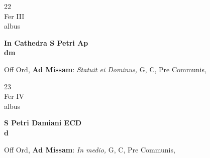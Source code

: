 \documentclass[10pt, openany]{book}
\begin{document}
        \begin{center}
            \begin{minipage}{3.5in}
                \vspace{2em}
                \begin{minipage}{0.5in}
                    {\Huge 22} \\
                    {\normalsize Fer III} \\
                    {\normalsize albus}
                \end{minipage}
                \begin{minipage}{3.0in}
                    \textbf{ \large In Cathedra S Petri Ap \\
                    \textnormal{\normalsize dm}} \\ 
                \end{minipage}
                \begin{justify}Off Ord, \textbf{Ad Missam}: \textit{Statuit ei Dominus,} G, C, Pre Communis,  
                \end{justify}
            \end{minipage}
        \end{center}
    
        \begin{center}
            \begin{minipage}{3.5in}
                \vspace{2em}
                \begin{minipage}{0.5in}
                    {\Huge 23} \\
                    {\normalsize Fer IV} \\
                    {\normalsize albus}
                \end{minipage}
                \begin{minipage}{3.0in}
                    \textbf{ \large S Petri Damiani ECD \\
                    \textnormal{\normalsize d}} \\ 
                \end{minipage}
                \begin{justify}Off Ord, \textbf{Ad Missam}: \textit{In medio,} G, C, Pre Communis,  
                \end{justify}
            \end{minipage}
        \end{center}
    
\end{document}
